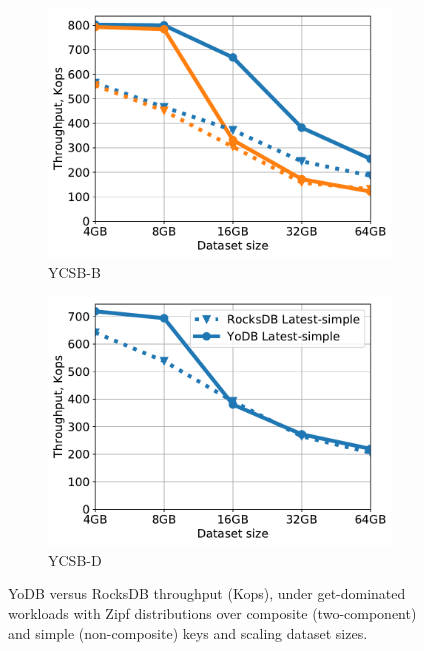 \documentclass[letterpaper,twocolumn,10pt]{article}
\newcommand{\sys}{YoDB}
\begin{document}
\begin{figure}[tb]
\centering
\begin{subfigure}{0.45\linewidth}
\includegraphics[width=\textwidth]{figs/Workload_B_line.pdf}
\caption{YCSB-B}
\label{fig:throughput:b}
\end{subfigure}
\begin{subfigure}{0.45\linewidth}
\includegraphics[width=\textwidth]{figs/Workload_D_line.pdf}
\caption{YCSB-D}
\label{fig:throughput:d}
\end{subfigure}
\caption{
{\sys\/ versus RocksDB throughput (Kops), under get-dominated workloads with Zipf distributions over composite (two-component) and
simple (non-composite) keys and scaling dataset sizes.}
}
\label{fig:gets}
\end{figure}
\end{document}

